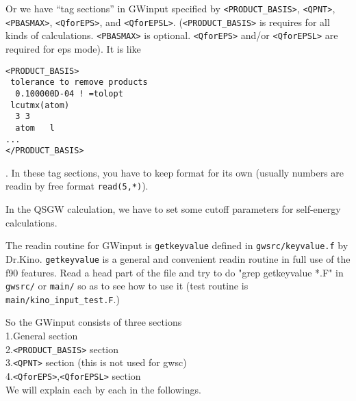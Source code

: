 \documentclass[a4paper,10pt,epsf,fleqn]{article}
\begin{document}
Or we have ``tag sections'' in {\sf GWinput} 
specified by \verb#<PRODUCT_BASIS>#, 
\verb#<QPNT>#,  \verb#<PBASMAX>#, \verb#<QforEPS>#, and \verb#<QforEPSL>#.
(\verb#<PRODUCT_BASIS># is requires for all kinds of calculations.
\verb#<PBASMAX># is optional. \verb#<QforEPS># and/or \verb#<QforEPSL># are required
for eps mode). It is like
\begin{verbatim}
<PRODUCT_BASIS>
 tolerance to remove products
  0.100000D-04 ! =tolopt
 lcutmx(atom) 
  3 3 
  atom   l
...
</PRODUCT_BASIS>
\end{verbatim}
. In these tag sections, you have to keep format for its own
(usually numbers are readin by free format \verb#read(5,*)#).

In the QSGW calculation, we have to set some cutoff parameters
for self-energy calculations.

The readin routine for GWinput is \verb#getkeyvalue# defined in \verb#gwsrc/keyvalue.f# by Dr.Kino.
\verb#getkeyvalue# is a general and convenient readin routine in full use of the f90 features.
Read a head part of the file and try to do "grep getkeyvalue *.F" 
in \verb#gwsrc/# or \verb#main/# so as to see how to use it
(test routine is \verb#main/kino_input_test.F#.)

So the {\sf GWinput} consists of three sections \\
1.General section \\
2.\verb#<PRODUCT_BASIS># section\\
3.\verb#<QPNT># section (this is not used for gwsc)\\
4.\verb#<QforEPS>#,\verb#<QforEPSL># section\\
We will explain each by each in the followings.
\end{document}
